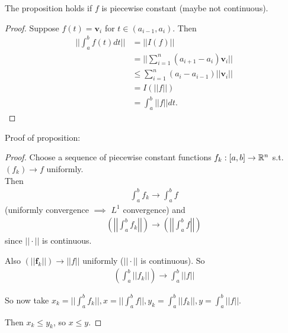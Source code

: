 \documentclass[a4paper]{article}
\begin{document}
\begin{lemma}
The proposition holds if $f$ is piecewise constant (maybe not continuous).
\begin{proof}
Suppose $f\left(t\right) = \mathbf{v}_i$ for $t\in\left(a_{i-1},a_i\right)$. Then
\begin{equation*}
\begin{aligned}
||\int_a^b f\left(t\right) dt || &= ||I\left(f\right)||\\
&= ||\sum_{i=1}^n \left(a_{i+1}-a_i\right)\mathbf{v}_i||\\
&\leq \sum_{i=1}^n \left(a_i-a_{i-1}\right) ||\mathbf{v}_i||\\
&= I\left(||f||\right)\\
&= \int_a^b ||f|| dt.
\end{aligned}
\end{equation*}
\end{proof}
\end{lemma}

Proof of proposition:
\begin{proof}
Choose a sequence of piecewise constant functions $f_k: \left[a,b\right] \to \mathbb{R}^n$ s.t. $\left(f_k\right) \to f$ uniformly.\\
Then
\begin{equation*}
\begin{aligned}
\int_a^b f_k \to \int_a^b f
\end{aligned}
\end{equation*}
(uniformly convergence $\implies$ $L^1$ convergence) and
\begin{equation*}
\begin{aligned}
\left(\left|\left|\int_a^b f_k\right|\right|\right) \to \left(\left|\left|\int_a^b f\right|\right| \right)
\end{aligned}
\end{equation*}
since $||\cdot||$ is continuous.

Also $\left(||\mathbf{f}_k||\right) \to ||f||$ uniformly ($||\cdot||$ is continuous). So
\begin{equation*}
\begin{aligned}
\left(\int_a^b ||f_k||\right) \to \int_a^b ||f||
\end{aligned}
\end{equation*}

So now take $x_k = ||\int_a^b f_k||, x=||\int_a^b f||, y_k = \int_a^b ||f_k||, y=\int_a^b ||f||$.

Then $x_k \leq y_k$, so $x \leq y$.
\end{proof}
\end{document}
